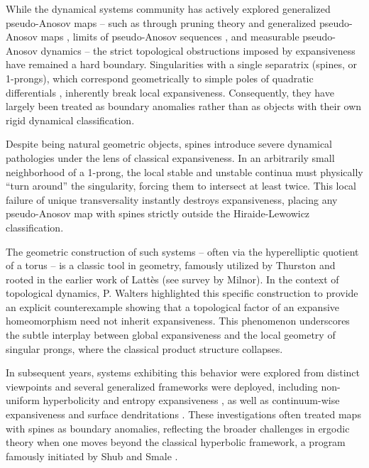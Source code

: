\documentclass{amsart}
\theoremstyle{plain}
\theoremstyle{definition}
\begin{document}
While the dynamical systems community has actively explored generalized pseudo-Anosov maps -- 
such as through pruning theory and generalized pseudo-Anosov maps \cite{CH, CH2}, limits of pseudo-Anosov sequences \cite{BCGH}, and measurable pseudo-Anosov dynamics \cite{BCH} -- the strict topological obstructions imposed by expansiveness have remained a hard boundary.
Singularities with a single separatrix (spines, or 1-prongs), which correspond geometrically to simple poles of quadratic differentials \cite{MasurSmillie1993}, inherently break local expansiveness. Consequently, they have largely been treated as boundary anomalies rather than as objects with their own rigid dynamical classification.


Despite being natural geometric objects, spines introduce severe dynamical pathologies under the lens of classical expansiveness. In an arbitrarily small neighborhood of a 1-prong, the local stable and unstable continua must physically ``turn around'' the singularity, forcing them to intersect at least twice. This local failure of unique transversality instantly destroys expansiveness, placing any pseudo-Anosov map with spines strictly outside the Hiraide-Lewowicz classification.

The geometric construction of such systems -- often via the hyperelliptic quotient of a torus -- is a classic tool in geometry, famously utilized by Thurston \cite{T} and rooted in the earlier work of Latt\`es (see survey \cite{Milnor06} by Milnor). In the context of topological dynamics, P. Walters \cite{W} highlighted this  specific construction to provide an explicit counterexample showing that
a topological factor of an expansive homeomorphism need not inherit expansiveness. This phenomenon underscores the subtle interplay between global expansiveness and the local geometry of singular prongs, where the classical product structure collapses.

In subsequent years, systems exhibiting this behavior were explored from distinct viewpoints and  several generalized frameworks were deployed, including non-uniform hyperbolicity and entropy expansiveness \cite{PPV, PV}, as well as continuum-wise expansiveness and surface dendritations \cite{AAV, Artanom, ArD}. These investigations often treated maps with spines as boundary anomalies, 
reflecting the broader challenges in ergodic theory when one moves  beyond
the classical hyperbolic framework, a program famously initiated by Shub and Smale \cite{Mane1987, SS}. 
\end{document}
